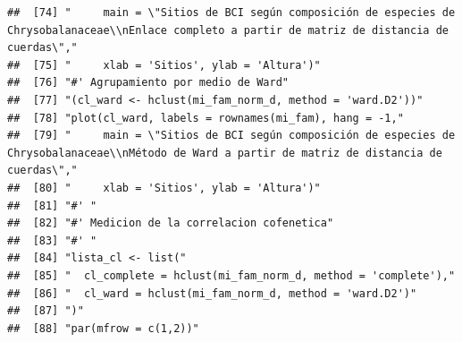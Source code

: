 \documentclass[11pt,]{article}
\begin{document}
\begin{verbatim}
##  [74] "     main = \"Sitios de BCI según composición de especies de Chrysobalanaceae\\nEnlace completo a partir de matriz de distancia de cuerdas\","                         
##  [75] "     xlab = 'Sitios', ylab = 'Altura')"                                                                                                                                
##  [76] "#' Agrupamiento por medio de Ward"                                                                                                                                     
##  [77] "(cl_ward <- hclust(mi_fam_norm_d, method = 'ward.D2'))"                                                                                                                
##  [78] "plot(cl_ward, labels = rownames(mi_fam), hang = -1,"                                                                                                                   
##  [79] "     main = \"Sitios de BCI según composición de especies de Chrysobalanaceae\\nMétodo de Ward a partir de matriz de distancia de cuerdas\","                          
##  [80] "     xlab = 'Sitios', ylab = 'Altura')"                                                                                                                                
##  [81] "#' "                                                                                                                                                                   
##  [82] "#' Medicion de la correlacion cofenetica"                                                                                                                              
##  [83] "#' "                                                                                                                                                                   
##  [84] "lista_cl <- list("                                                                                                                                                     
##  [85] "  cl_complete = hclust(mi_fam_norm_d, method = 'complete'),"                                                                                                           
##  [86] "  cl_ward = hclust(mi_fam_norm_d, method = 'ward.D2')"                                                                                                                 
##  [87] ")"                                                                                                                                                                     
##  [88] "par(mfrow = c(1,2))"                                                                                                                                                   

\end{verbatim}
\end{document}
